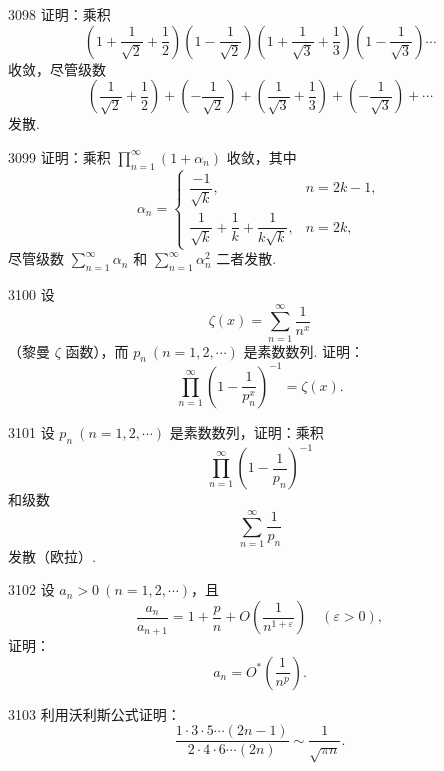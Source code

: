 \begin{prob}[M]{3098}
证明：乘积
\[
\left(1 + \frac{1}{\sqrt{2}} + \frac{1}{2}\right)\left(1 - \frac{1}{\sqrt{2}}\right)\left(1 + \frac{1}{\sqrt{3}} + \frac{1}{3}\right)\left(1 - \frac{1}{\sqrt{3}}\right)\cdots
\]
收敛，尽管级数
\[
\left(\frac{1}{\sqrt{2}} + \frac{1}{2}\right) + \left(-\frac{1}{\sqrt{2}}\right) + \left(\frac{1}{\sqrt{3}} + \frac{1}{3}\right) + \left(-\frac{1}{\sqrt{3}}\right) + \cdots
\]
发散.
\end{prob}

\begin{prob}[M]{3099}
证明：乘积 $\displaystyle \prod_{n=1}^{\infty} (1 + \alpha_{n})$ 收敛，其中
\[
\alpha_{n} = \begin{cases}
\dfrac{-1}{\sqrt{k}}, & n = 2k-1, \\
\dfrac{1}{\sqrt{k}} + \dfrac{1}{k} + \dfrac{1}{k\sqrt{k}}, & n = 2k,
\end{cases}
\]
尽管级数 $\displaystyle \sum_{n=1}^{\infty} \alpha_{n}$ 和 $\displaystyle \sum_{n=1}^{\infty} \alpha_{n}^{2}$ 二者发散.
\end{prob}

\begin{prob}[M]{3100}
设
\[
\zeta(x) = \sum_{n=1}^{\infty} \frac{1}{n^{x}}
\]
（黎曼 $\zeta$ 函数），而 $p_{n} \ (n = 1, 2, \cdots)$ 是素数数列. 证明：
\[
\prod_{n=1}^{\infty} \left(1 - \frac{1}{p_{n}^{x}}\right)^{-1} = \zeta(x).
\]
\end{prob}

\begin{prob}[M]{3101}
设 $p_{n} \ (n = 1, 2, \cdots)$ 是素数数列，证明：乘积
\[
\prod_{n=1}^{\infty} \left(1 - \frac{1}{p_{n}}\right)^{-1}
\]
和级数
\[
\sum_{n=1}^{\infty} \frac{1}{p_{n}}
\]
发散（欧拉）.
\end{prob}

\begin{prob}[M]{3102}
设 $a_{n} > 0 \ (n = 1, 2, \cdots)$，且
\[
\frac{a_{n}}{a_{n+1}} = 1 + \frac{p}{n} + O\left(\frac{1}{n^{1+\varepsilon}}\right) \quad (\varepsilon > 0),
\]
证明：
\[
a_{n} = O^{*}\left(\frac{1}{n^{p}}\right).
\]
\end{prob}

\begin{prob}[S]{3103}
利用沃利斯公式证明：
\[
\frac{1 \cdot 3 \cdot 5 \cdots (2n-1)}{2 \cdot 4 \cdot 6 \cdots (2n)} \sim \frac{1}{\sqrt{\pi n}}.
\]
\end{prob}

